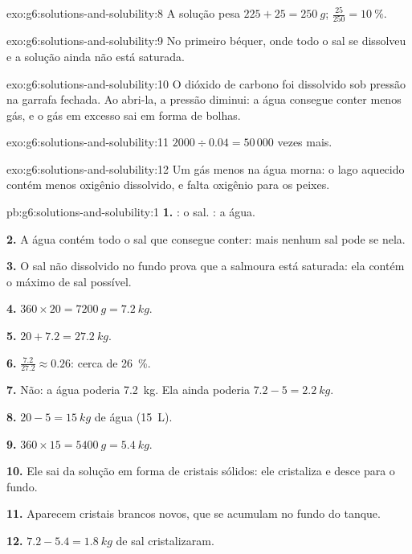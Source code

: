 \begin{solution}{exo:g6:solutions-and-solubility:8}
A solução pesa $225 + 25 = \qty{250}{g}$; $\frac{25}{250} =
\qty{10}{\percent}$.
\end{solution}

\begin{solution}{exo:g6:solutions-and-solubility:9}
No primeiro béquer, onde todo o sal se dissolveu e a solução ainda não
está saturada.
\end{solution}

\begin{solution}{exo:g6:solutions-and-solubility:10}
O dióxido de carbono foi dissolvido sob pressão na garrafa fechada. Ao
abri-la, a pressão diminui: a água consegue conter menos gás, e o gás em
excesso sai em forma de bolhas.
\end{solution}

\begin{solution}{exo:g6:solutions-and-solubility:11}
$2000 \div 0.04 = 50\,000$ vezes mais.
\end{solution}

\begin{solution}{exo:g6:solutions-and-solubility:12}
Um gás  menos na água morna: o lago aquecido contém menos
oxigênio dissolvido, e falta oxigênio para os peixes.
\end{solution}

\begin{solution}{pb:g6:solutions-and-solubility:1}
\textbf{1.} : o sal. : a água.

\textbf{2.} A água contém todo o sal que consegue conter: mais nenhum sal
pode se  nela.

\textbf{3.} O sal não dissolvido no fundo prova que a salmoura está
saturada: ela contém o máximo de sal possível.

\textbf{4.} $360 \times 20 = \qty{7200}{g} = \qty{7.2}{kg}$.

\textbf{5.} $20 + 7.2 = \qty{27.2}{kg}$.

\textbf{6.} $\frac{7.2}{27.2} \approx 0.26$: cerca de \qty{26}{\percent}.

\textbf{7.} Não: a água poderia  \qty{7.2}{kg}. Ela ainda
poderia  $7.2 - 5 = \qty{2.2}{kg}$.

\textbf{8.} $20 - 5 = \qty{15}{kg}$ de água (\qty{15}{L}).

\textbf{9.} $360 \times 15 = \qty{5400}{g} = \qty{5.4}{kg}$.

\textbf{10.} Ele sai da solução em forma de cristais sólidos: ele
cristaliza e desce para o fundo.

\textbf{11.} Aparecem cristais brancos novos, que se acumulam no fundo do
tanque.

\textbf{12.} $7.2 - 5.4 = \qty{1.8}{kg}$ de sal cristalizaram.
\end{solution}
